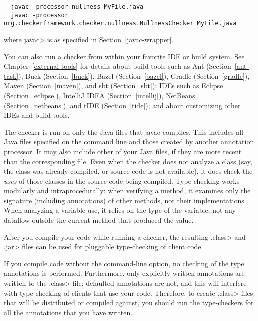 \begin{Verbatim}
  javac -processor nullness MyFile.java
  javac -processor org.checkerframework.checker.nullness.NullnessChecker MyFile.java
\end{Verbatim}

\noindent
where \<javac> is as specified in Section~\ref{javac-wrapper}.

You can also run a checker from within your favorite IDE or build system.  See
Chapter~\ref{external-tools} for details about build tools such as
Ant (Section~\ref{ant-task}),
Buck (Section~\ref{buck}),
Bazel (Section~\ref{bazel}),
Gradle (Section~\ref{gradle}),
Maven (Section~\ref{maven}), and
sbt (Section~\ref{sbt});
IDEs such as
Eclipse (Section~\ref{eclipse}),
IntelliJ IDEA (Section~\ref{intellij}),
NetBeans (Section~\ref{netbeans}),
and
tIDE (Section~\ref{tide});
and about customizing other IDEs and build tools.

The checker is run on only the Java files that javac compiles.
This includes all Java files specified on the command line and those
created by another annotation processor.  It may also include other of
your Java files, if they are more recent than the corresponding  file.
Even when the checker does not analyze a class (say, the class was
already compiled, or source code is not available), it does check
the \emph{uses} of those classes in the source code being compiled.
Type-checking works modularly and intraprocedurally:  when verifying a
method, it examines only the signature (including annotations) of other
methods, not their implementations.  When analyzing a variable use, it
relies on the type of the variable, not any dataflow outside the current
method that produced the value.

After you compile your code while running a checker, the resulting
\<.class> and \<.jar> files can be used for pluggable type-checking of client code.

If you compile code without the 
command-line option, no checking of the type
annotations is performed.  Furthermore, only explicitly-written annotations
are written to the \<.class> file; defaulted annotations are not, and this
will interfere with type-checking of clients that use your code.
Therefore, to create
\<.class> files that will be distributed or compiled against, you should run the
type-checkers for all the annotations that you have written.



